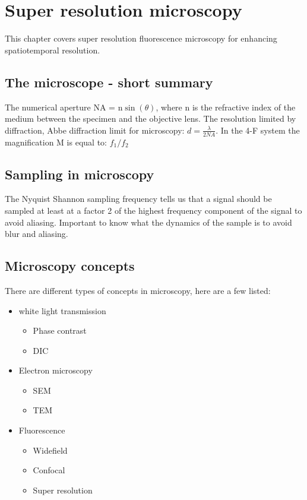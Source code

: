 \section{Super resolution microscopy}
This chapter covers super resolution fluorescence microscopy for enhancing spatiotemporal resolution.

	\subsection{The microscope - short summary}
	The numerical aperture NA = n$\sin(\theta)$, where n is the refractive index of the medium between the specimen and the objective lens. The resolution limited by diffraction, Abbe diffraction limit for microscopy: $d = \frac{\lambda} {2NA}$. In the 4-F system the magnification M is equal to: $f_1 / f_2$

	\subsection{Sampling in microscopy}
	The Nyquist Shannon sampling frequency tells us that a signal should be sampled at least at a factor 2 of the highest frequency component of the signal to avoid aliasing. Important to know what the dynamics of the sample is to avoid blur and aliasing. 

	\subsection{Microscopy concepts}
	There are different types of concepts in microscopy, here are a few listed:

	\begin{itemize}
		\item white light transmission
		\begin{itemize}
			\item Phase contrast
			\item DIC
		\end{itemize}
		\item Electron microscopy
		\begin{itemize}
			\item SEM
			\item TEM
		\end{itemize}
		\item Fluorescence 
		\begin{itemize}
			\item Widefield
			\item Confocal
			\item Super resolution
		\end{itemize}
	\end{itemize}

